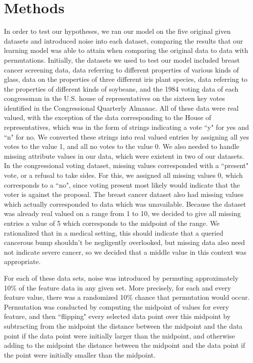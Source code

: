 \documentclass[twoside,11pt]{article}
\begin{document}
\section{Methods}
In order to test our hypotheses, we ran our model on the five original given datasets and introduced noise into each dataset,
comparing the results that our learning model was able to attain when comparing the original data to data with permutations.
Initially, the datasets we used to test our model included breast cancer screening data, data referring to different properties of
various kinds of glass, data on the properties of three different iris plant species, data referring to the properties of different 
kinds of soybeans, and the 1984 voting data of each congressman in the U.S. house of representatives on the sixteen key 
votes identified in the Congressional Quarterly Almanac. All of these data were real valued, with the exception of the data 
corresponding to the House of representatives, which was in the form of strings indicating a vote ``y" for yes and ``n" for no.
We converted these strings into real valued entries by assigning all yes votes to the value 1, and all no votes to the value 0.
We also needed to handle missing attribute values in our data, which were existent in two of our datasets. In the congressional
 voting dataset, missing values corresponded with a ``present" vote, or a refusal to take sides. For this, we assigned all missing 
 values 0, which corresponds to a ``no", since voting present most likely would indicate that the voter is against the proposal. 
 The breast cancer dataset also had missing values which actually corresponded to data which was unavailable. Because the dataset
  was already real valued on a range from 1 to 10, we decided to give all missing entries a value of 5 which corresponds to the midpoint
  of the range. We rationalized that in a medical setting, this should indicate that a queried cancerous bump shouldn't be negligently overlooked,
  but missing data also need not indicate severe cancer, so we decided that a middle value in this context was appropriate. 


For each of these data sets, noise was introduced by permuting
approximately 10\% of the feature data in any given set. More precisely, for each and every feature value, there was a randomized 10\%
chance that permutation would occur. Permutation was conducted by computing the midpoint of values for every feature, and then
``flipping" every selected data point over this midpoint by subtracting from the midpoint the distance between the midpoint and the data point
if the data point were initially larger than the midpoint, and otherwise adding to the midpoint the distance between the midpoint and the data
point if the point were initially smaller than the midpoint. 
\end{document}

